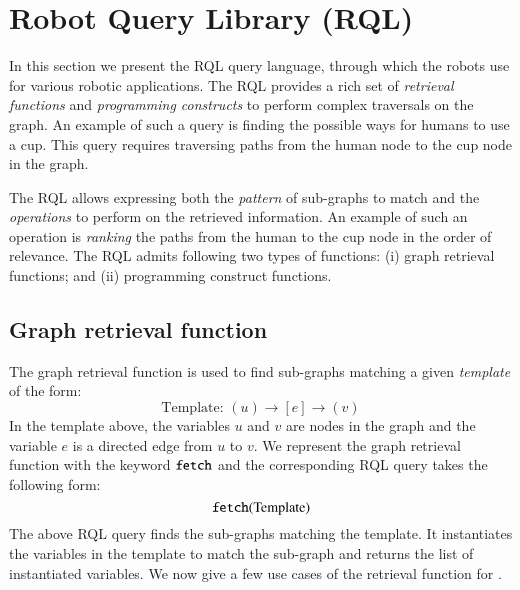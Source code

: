 \section{Robot Query Library (RQL)}
\label{sec:raquel}
In this section we present the RQL query language,
through which the robots use \robobrain{} for various robotic applications.
The RQL provides a rich set of \textit{retrieval functions} and \textit{programming constructs} to
perform complex traversals on the \robobrain{} graph. An example of such a query is finding the possible ways
for humans to use a cup. This query requires traversing paths from the human node to the cup node in
the \robobrain{} graph.

The RQL allows expressing both the \textit{pattern} of sub-graphs to match and the
\textit{operations} to perform on the retrieved information. An example of such an operation is
\textit{ranking} the paths from the human to the cup node in the order of relevance. The RQL admits following two types of functions: (i) graph retrieval
functions; and (ii) programming construct functions.

\subsection{Graph retrieval function}
The graph retrieval function is used to find sub-graphs matching a given \textit{template} of the form: $$\text{Template: }(u)\rightarrow [e] \rightarrow (v)$$
In the template above, the variables $u$ and $v$ are nodes in the graph and the variable $e$ is a directed edge from $u$ to $v$. We represent the graph retrieval function with the keyword ${\tt fetch}$ and the corresponding RQL query takes the following form:
$${\tt fetch}(\text{Template})$$
The above RQL query finds the sub-graphs matching the template. It instantiates the variables in the template to match the sub-graph and returns the list of instantiated variables. We now give a few use cases of the retrieval function for \robobrain{}.

